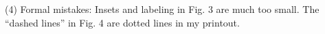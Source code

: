 (4) Formal mistakes: Insets and labeling in Fig. 3 are much too small. The ``dashed lines'' in Fig. 4 are dotted lines in my printout.

